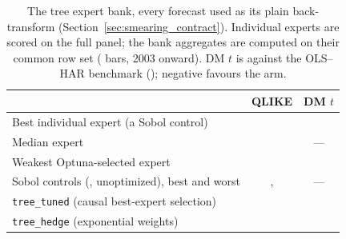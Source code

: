 \begin{table}[H]
\centering
\caption{The tree expert bank, every forecast used as its plain
back-transform (Section~\ref{sec:smearing_contract}). Individual experts
are scored on the full panel; the bank aggregates are computed on their
common row set (\unifTreeHedgeN{} bars, 2003 onward). DM $t$ is against the
OLS--HAR benchmark (\unifAzeroQLIKE{}); negative favours the arm.
\label{tab:tree_bank}}
\begin{tabular}{@{}lcc@{}}
\toprule
 & QLIKE & DM $t$ \\
\midrule
Best individual expert (a Sobol control) & \unifTreeBankBestQLIKE{} & \unifTreeBankBestDM{} \\
Median expert & \unifTreeBankMedianQLIKE{} & --- \\
Weakest Optuna-selected expert & \unifTreeBankWorstOptQLIKE{} & \unifTreeBankWorstOptDM{} \\
Sobol controls (\unifTreeBankNSobol{}, unoptimized), best and worst & \unifTreeBankSobolBestQLIKE{}, \unifTreeBankSobolWorstQLIKE{} & --- \\
\midrule
\texttt{tree\_tuned} (causal best-expert selection) & \unifTreeTunedQLIKE{} & \unifTreeTunedDM{} \\
\texttt{tree\_hedge} (exponential weights) & \unifTreeHedgeQLIKE{} & \unifTreeHedgeDM{} \\
\bottomrule
\end{tabular}
\end{table}


